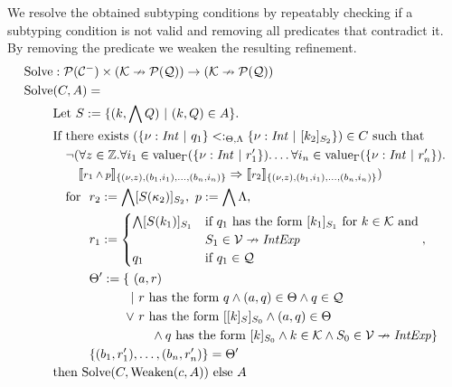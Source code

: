 \documentclass[]{scrbook}
\newcommand{\semantic}[1]{\llbracket \text{\footnotesize\texttt{#1}} \rrbracket}
\theoremstyle{definition}
\theoremstyle{definition}
\theoremstyle{definition}
\theoremstyle{remark}
\begin{document}
We resolve the obtained subtyping conditions by repeatably checking if a
subtyping condition is not valid and removing all predicates that
contradict it. By removing the predicate we weaken the resulting
refinement. \[
\begin{aligned}
\text{Solve}&:\mathcal{P}(\mathcal{C}^-)\times(\mathcal{K}\nrightarrow\mathcal{P}(\mathcal{Q}))\to(\mathcal{K}\nrightarrow\mathcal{P}(\mathcal{Q}))\\
\text{Solve}&(C,A)=\\
&\text{Let } S:=\{(k,\bigwedge Q) \ | \ (k,Q)\in A\}.\\
&\text{If there exists } (\{\nu:\mathit{Int}\ |\ q_1\}<:_{\Theta,\Lambda}\{\nu:\mathit{Int}\ |\ [k_2]_{S_2}\})\in C \text{ such that }\\
&\quad\neg (\forall z \in \mathbb{Z}.\forall i_1\in\text{value}_\Gamma(\{\nu:\mathit{Int}\ |\ r_1'\}).\dots \forall i_n\in\text{value}_\Gamma(\{\nu:\mathit{Int}\ |\ r_n'\}).\\
&\quad\quad\semantic{$r_1\land p$}_{\{(\nu,z),(b_1,i_1),\dots,(b_n,i_n)\}}\Rightarrow \semantic{$r_2$}_{\{(\nu,z),(b_1,i_1),\dots,(b_n,i_n)\}})\\
&\quad\begin{aligned}\text{for }\ &r_2 := \bigwedge [S(\kappa_2)]_{S_2},\ p:=\bigwedge\Lambda,\\
&r_1 := \begin{cases}\bigwedge [S(k_1)]_{S_1}&\text{if } q_1 \text{ has the form } [k_1]_{S_1} \text{ for } k\in\mathcal{K}\text{ and}\\
&S_1\in\mathcal{V}\nrightarrow\mathit{IntExp}\\
q_1& \text{if }q_1\in\mathcal{Q}
\end{cases},\\
&\begin{aligned} \Theta':= \{\ (&a,r)\\
   | \ &r \text{ has the form } q \land (a,q)\in\Theta \land q\in\mathcal{Q}\\
\lor \ &r \text{ has the form } [[k]_S]_{S_0}\land (a,q)\in\Theta\\
&\quad\land q \text{ has the form } [k]_{S_0} \land k\in\mathcal{K} \land S_0\in\mathcal{V}\nrightarrow\mathit{IntExp}\}
\end{aligned}\\
&\{(b_1,r_1'),\dots,(b_n,r_n')\}=\Theta'
\end{aligned}\\
&\text{then } \text{Solve}(C,\text{Weaken}(c,A)) \text{ else } A\\

\end{aligned}\]
\end{document}
